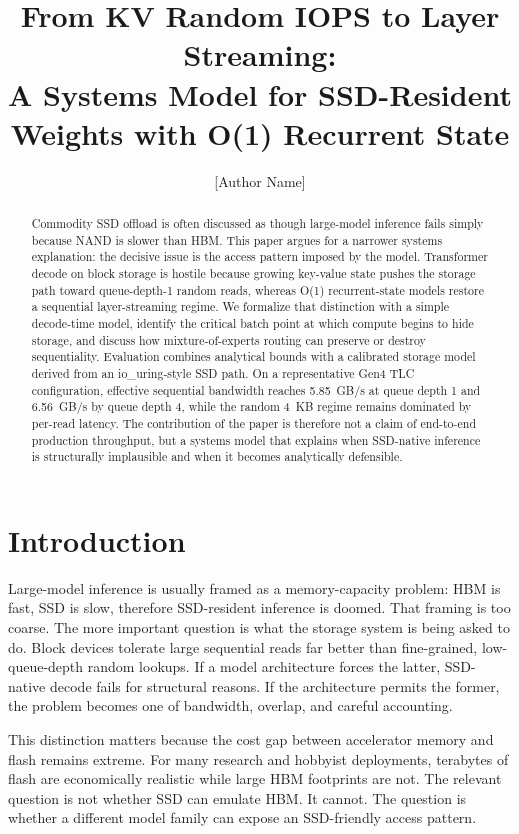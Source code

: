 \documentclass[11pt]{article}
\title{From KV Random IOPS to Layer Streaming:\\A Systems Model for SSD-Resident Weights with O(1) Recurrent State}
\author{[Author Name]}
\date{}
\begin{document}
\maketitle

\begin{abstract}
Commodity SSD offload is often discussed as though large-model inference fails simply because NAND is slower than HBM. This paper argues for a narrower systems explanation: the decisive issue is the access pattern imposed by the model. Transformer decode on block storage is hostile because growing key-value state pushes the storage path toward queue-depth-1 random reads, whereas O(1) recurrent-state models restore a sequential layer-streaming regime. We formalize that distinction with a simple decode-time model, identify the critical batch point at which compute begins to hide storage, and discuss how mixture-of-experts routing can preserve or destroy sequentiality. Evaluation combines analytical bounds with a calibrated storage model derived from an io\_uring-style SSD path. On a representative Gen4 TLC configuration, effective sequential bandwidth reaches 5.85~GB/s at queue depth 1 and 6.56~GB/s by queue depth 4, while the random 4~KB regime remains dominated by per-read latency. The contribution of the paper is therefore not a claim of end-to-end production throughput, but a systems model that explains when SSD-native inference is structurally implausible and when it becomes analytically defensible.
\end{abstract}

\section{Introduction}
Large-model inference is usually framed as a memory-capacity problem: HBM is fast, SSD is slow, therefore SSD-resident inference is doomed. That framing is too coarse. The more important question is what the storage system is being asked to do. Block devices tolerate large sequential reads far better than fine-grained, low-queue-depth random lookups. If a model architecture forces the latter, SSD-native decode fails for structural reasons. If the architecture permits the former, the problem becomes one of bandwidth, overlap, and careful accounting.

This distinction matters because the cost gap between accelerator memory and flash remains extreme. For many research and hobbyist deployments, terabytes of flash are economically realistic while large HBM footprints are not. The relevant question is not whether SSD can emulate HBM. It cannot. The question is whether a different model family can expose an SSD-friendly access pattern.
\end{document}
